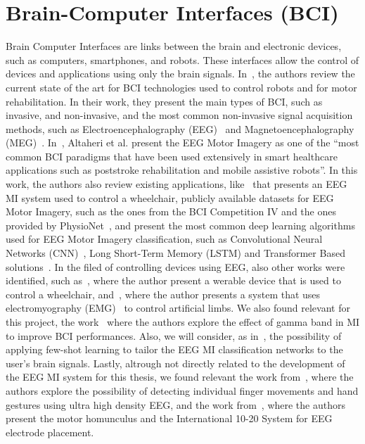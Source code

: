 \section{Brain-Computer Interfaces (BCI)}
Brain Computer Interfaces are links between the brain and electronic devices, such as computers, smartphones, and robots.
These interfaces allow the control of devices and applications using only the brain signals.
In~\cite{robinson2021emerging}, the authors review the current state of the art for BCI technologies used to control robots and for motor rehabilitation.
In their work, they present the main types of BCI, such as invasive, and non-invasive, and the most common non-invasive signal acquisition methods, such as Electroencephalography (EEG)~\cite{niedermeyer2005electroencephalography} and Magnetoencephalography (MEG)~\cite{singh2014magnetoencephalography}.
In~\cite{altaheri_deep_2023}, Altaheri et al. present the EEG Motor Imagery as one of the ``most common BCI paradigms that have been used extensively in smart healthcare applications such as poststroke rehabilitation and mobile assistive robots''.
In this work, the authors also review existing applications, like~\cite{tang2020motor} that presents an EEG MI system used to control a wheelchair, publicly available datasets for EEG Motor Imagery, such as the ones from the BCI Competition IV and the ones provided by PhysioNet~\cite{goldberger2000physiobank, schalk2004bci2000}, and present the most common deep learning algorithms used for EEG Motor Imagery classification, such as Convolutional Neural Networks (CNN)~\cite{lawhern2018eegnet}, Long Short-Term Memory (LSTM) and Transformer Based solutions~\cite{sharma_deep_2023}.
In the filed of controlling devices using EEG, also other works were identified, such as~\cite{10471624}, where the author present a werable device that is used to control a wheelchair, and~\cite{10453986}, where the author presents a system that uses electromyography (EMG)~\cite{mills2005basics} to control artificial limbs.
We also found relevant for this project, the work~\cite{ahn2013gamma} where the authors explore the effect of gamma band in MI to improve BCI performances.
Also, we will consider, as in~\cite{mammone2023few}, the possibility of applying few-shot learning to tailor the EEG MI classification networks to the user's brain signals.
Lastly, altrough not directly related to the development of the EEG MI system for this thesis, we found relevant the work from~\cite{10123901, lee2022individual}, where the authors explore the possibility of detecting individual finger movements and hand gestures using ultra high density EEG, and the work from~\cite{penfield1950cerebral, jasper1958ten}, where the authors present the motor homunculus and the International 10-20 System for EEG electrode placement.

